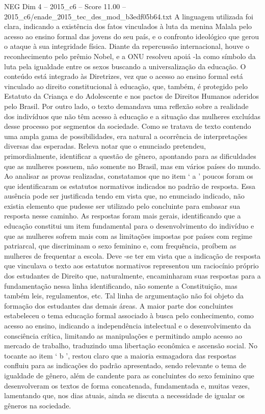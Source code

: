 \begin{textsample}{NEG Dim 4 – 2015\_c6 – Score 11.00 – 2015\_c6/enade\_2015\_tec\_des\_mod\_b3edf05b64.txt}
A linguagem utilizada foi clara, indicando a existência dos fatos vinculados à luta da menina Malala pelo acesso ao ensino formal das jovens do seu país, e o confronto ideológico que gerou o ataque à sua integridade física.
Diante da repercussão internacional, houve o reconhecimento pelo prêmio Nobel, e a ONU resolveu apoiá -la como símbolo da luta pela igualdade entre os sexos buscando a universalização da educação.
O conteúdo está integrado às Diretrizes, vez que o acesso ao ensino formal está vinculado ao direito constitucional à educação, que, também, é protegido pelo Estatuto da Criança e do Adolescente e nos pactos de Direitos Humanos aderidos pelo Brasil.
Por outro lado, o texto demandava uma reflexão sobre a realidade dos indivíduos que não têm acesso à educação e a situação das mulheres excluídas desse processo por segmentos da sociedade.
Como se tratava de texto contendo uma ampla gama de possibilidades, era natural a ocorrência de interpretações diversas das esperadas.
Releva notar que o enunciado pretendeu, primordialmente, identificar a questão de gênero, apontando para as dificuldades que as mulheres possuem, não somente no Brasil, mas em vários países do mundo.
Ao analisar as provas realizadas, constatamos que no item ‘ a ’ poucos foram os que identificaram os estatutos normativos indicados no padrão de resposta.
Essa ausência pode ser justificada tendo em vista que, no enunciado indicado, não existia elemento que pudesse ser utilizado pelo concluinte para embasar sua resposta nesse caminho.
As respostas foram mais gerais, identificando que a educação constitui um item fundamental para o desenvolvimento do indivíduo e que as mulheres sofrem mais com as limitações impostas por países com regime patriarcal, que discriminam o sexo feminino e, com frequência, proíbem as mulheres de frequentar a escola.
Deve -se ter em vista que a indicação de resposta que vinculava o texto aos estatutos normativos representou um raciocínio próprio dos estudantes de Direito que, naturalmente, encaminharam suas respostas para a fundamentação nessa linha identificando, não somente a Constituição, mas também leis, regulamentos, etc.
Tal linha de argumentação não foi objeto da formação dos estudantes das demais áreas.
A maior parte dos concluintes estabeleceu o tema educação formal associado à busca pelo conhecimento, como acesso ao ensino, indicando a independência intelectual e o desenvolvimento da consciência crítica, limitando as manipulações e permitindo amplo acesso ao mercado de trabalho, traduzindo uma libertação econômica e ascensão social.
No tocante ao item ‘ b ’, restou claro que a maioria esmagadora das respostas confluiu para as indicações do padrão apresentado, sendo relevante o tema de igualdade de gênero, além de candente para as concluintes do sexo feminino que desenvolveram os textos de forma concatenada, fundamentada e, muitas vezes, lamentando que, nos dias atuais, ainda se discuta a necessidade de igualar os gêneros na sociedade.

\end{textsample}
